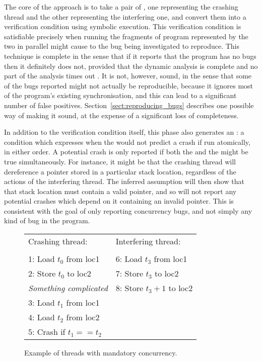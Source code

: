 The core of the approach is to take a pair of {\StateMachines}, one
representing the crashing thread and the other representing the
interfering one, and convert them into a verification
condition\needCite{} using symbolic execution\needCite{}.  This
verification condition is satisfiable precisely when running the
fragments of program represented by the two {\StateMachines} in
parallel might cause to the bug being investigated to reproduce.  This
technique is complete in the sense that if it reports that the program
has no bugs then it definitely does not, provided that the dynamic
analysis is complete and no part of the analysis times out .  It is not, however, sound,
in the sense that some of the bugs reported might not actually be
reproducible, because it ignores most of the program's existing
synchronisation, and this can lead to a significant number of false
positives.  Section~\ref{sect:reproducing_bugs} describes one possible
way of making it sound, at the expense of a significant loss of
completeness.

In addition to the verification condition itself, this phase also
generates an : a condition which expresses
when the {\StateMachines} would not predict a crash if run atomically,
in either order.  A potential crash is only reported if both the
 and the 
might be true simultaneously.  For instance, it might be that the
crashing thread will dereference a pointer stored in a particular
stack location, regardless of the actions of the interfering thread.
The inferred assumption will then show that that stack location must
contain a valid pointer, and so {\technique} will not report any
potential crashes which depend on it containing an invalid pointer.
This is consistent with the goal of only reporting concurrency bugs,
and not simply any kind of bug in the program.

\begin{figure}
\begin{centering}
\hfill
\begin{tabular}{p{8cm}l}
Crashing thread:\hfill         & Interfering thread: \\
\\
1: Load $t_0$ from loc1        & 6: Load $t_3$ from loc1 \\
2: Store $t_0$ to loc2         & 7: Store $t_3$ to loc2 \\
\textit{Something complicated} & 8: Store $t_3 + 1$ to loc2 \\
3: Load $t_1$ from loc1        & \\
4: Load $t_2$ from loc2        & \\
5: Crash if $t_1 == t_2$ & \\
\end{tabular}
\hfill
\end{centering}
\caption{Example of threads with mandatory concurrency.}
\label{fig:mandatory_concurrency1}
\end{figure}

